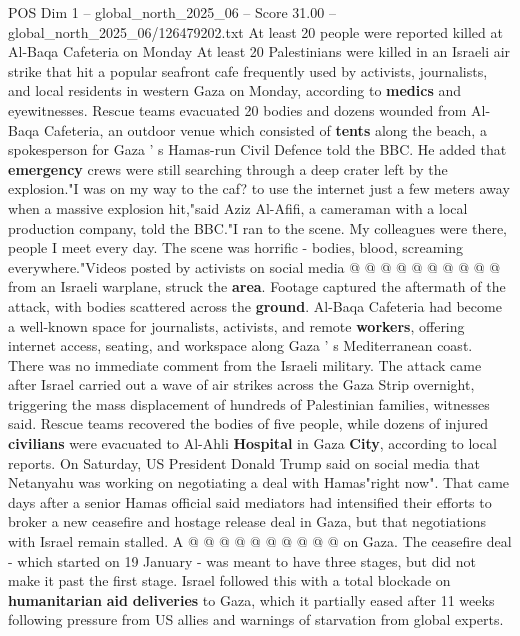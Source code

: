 \begin{textsample}{POS Dim 1 – global\_north\_2025\_06 – Score 31.00 – global\_north\_2025\_06/126479202.txt}  \label{ex:f1_pos_309}
At least 20 people were reported killed at Al-Baqa Cafeteria on Monday At least 20 Palestinians were killed in an Israeli air strike that hit a popular seafront cafe frequently used by activists, journalists, and local residents in western Gaza on Monday, according to \textbf{medics} and eyewitnesses.
Rescue teams evacuated 20 bodies and dozens wounded from Al-Baqa Cafeteria, an outdoor venue which consisted of \textbf{tents} along the beach, a spokesperson for Gaza ' s Hamas-run Civil Defence told the BBC.
He added that \textbf{emergency} crews were still searching through a deep crater left by the explosion."I was on my way to the caf? to use the internet just a few meters away when a massive explosion hit,"said Aziz Al-Afifi, a cameraman with a local production company, told the BBC."I ran to the scene.
My colleagues were there, people I meet every day.
The scene was horrific - bodies, blood, screaming everywhere."Videos posted by activists on social media @ @ @ @ @ @ @ @ @ @ from an Israeli warplane, struck the \textbf{area}.
Footage captured the aftermath of the attack, with bodies scattered across the \textbf{ground}.
Al-Baqa Cafeteria had become a well-known space for journalists, activists, and remote \textbf{workers}, offering internet access, seating, and workspace along Gaza ' s Mediterranean coast.
There was no immediate comment from the Israeli military.
The attack came after Israel carried out a wave of air strikes across the Gaza Strip overnight, triggering the mass displacement of hundreds of Palestinian families, witnesses said.
Rescue teams recovered the bodies of five people, while dozens of injured \textbf{civilians} were evacuated to Al-Ahli \textbf{Hospital} in Gaza \textbf{City}, according to local reports.
On Saturday, US President Donald Trump said on social media that Netanyahu was working on negotiating a deal with Hamas"right now".
That came days after a senior Hamas official said mediators had intensified their efforts to broker a new ceasefire and hostage release deal in Gaza, but that negotiations with Israel remain stalled.
A @ @ @ @ @ @ @ @ @ @ on Gaza.
The ceasefire deal - which started on 19 January - was meant to have three stages, but did not make it past the first stage.
Israel followed this with a total blockade on \textbf{humanitarian} \textbf{aid} \textbf{deliveries} to Gaza, which it partially eased after 11 weeks following pressure from US allies and warnings of starvation from global experts.

\end{textsample}
